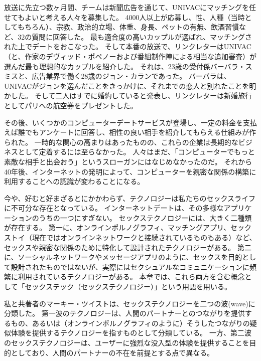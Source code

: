 \documentclass[paper=a4,book,openany]{jlreq}
\begin{document}
放送に先立つ数ヶ月間、チームは新聞広告を通じて、UNIVACにマッチングを任せてもよいと考える人々を募集した。
4000人以上が応募し、性、人種（当時としてもちろん）、宗教、政治的立場、体重、身長、ペットの有無、飲酒習慣など、32の質問に回答した。
最も適合度の高いカップルが選ばれ、マッチングされた上でデートをおこなった。
そして本番の放送で、リンクレターはUNIVAC（と、作家のデヴィッド・ポペノーおよび番組制作陣による相当な追加審査）が選んだ最も理想的なカップルを紹介した。
それは、23歳の受付係バーバラ・スミスと、広告業界で働く28歳のジョン・カランであった。
バーバラは、UNIVACがジョンを選んだことをきっかけに、それまでの恋人と別れたことを明かした。
そして二人はすでに婚約していると発表し、リンクレターは新婚旅行としてパリへの航空券をプレゼントした。

その後、いくつかのコンピューターデートサービスが登場し、一定の料金を支払えば誰でもアンケートに回答し、相性の良い相手を紹介してもらえる仕組みが作られた。
一時的な関心の高まりはあったものの、これらの企業は長期的なビジネスとして定着するには至らなかった。
人々はまだ、「コンピューターでもっと素敵な相手と出会おう」というスローガンにはなじめなかったのだ。
それから40年後、インターネットの発明によって、コンピューターを親密な関係の構築に利用することへの認識が変わることになる。

今や、好むと好まざるとにかかわらず、テクノロジーは私たちのセックスライフに不可分な存在となっている。
インターネットデートは、その多様なアプリケーションのうちの一つにすぎない。
セックステクノロジーには、大きく二種類が存在する。
第一に、オンラインポルノグラフィ、マッチングアプリ、セックストイ（現在ではオンラインネットワークと接続されているものもある）など、セックスや親密な関係のために特化して設計されたテクノロジーがある。
第二に、ソーシャルネットワークやメッセージアプリのように、セックスを目的として設計されたものではないが、実際にはセクシュアルなコミュニケーションに頻繁に利用されているテクノロジーがある。
本章では、これら両方を含む概念として「セックステック（セックステクノロジー）」という用語を用いる。

私と共著者のマーキー・ツイストは、セックステクノロジーを二つの波(wave)に分類した\citep{mcarthur17:_rise_digis}。
第一波のテクノロジーは、人間のパートナーとのつながりを提供するもの、あるいは（オンラインポルノグラフィのように）そうしたつながりの疑似体験を提供するテクノロジーを指すものとして分類している。
一方、第二波のセックステクノロジーは、ユーザーに強烈な没入型の体験を提供することを目的としており、人間のパートナーの不在を前提とする点で異なる。
\end{document}
